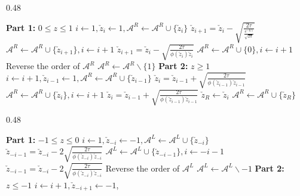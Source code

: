 \documentclass[opre,sglanonrev]{informs4}
\newcommand{\zz}{\check{z}}
\begin{document}
{\begin{APPENDICES}
\begin{table}[ht]
\begin{subtable}[t]{0.48\linewidth}
\begin{algorithmic}[1]
      \State \textbf{Part 1:} $0\leq z \leq 1$
      \State $i \gets 1, \check{z}_{i} \gets 1, \mathcal{A}^{R} \gets \mathcal{A}^{R} \cup \{\check{z}_{i}\}$
      \State $ \check{z}_{i+1} =  \check{z}_i - \sqrt{\frac{2\tau}{\frac{e^{-0.5}}{\sqrt{2 \pi}}}}$
      \vspace{5pt}
      \State $\mathcal{A}^{R} \gets \mathcal{A}^{R} \cup \{\check{z}_{i+1}\}, i \gets i + 1$
      \State $\check{z}_{i+1} = \check{z}_{i} -  \sqrt{\frac{2\tau}{\phi(\check{z}_{i})\check{z}_{i}}}$
      \EndWhile
      \State $\mathcal{A}^R \gets \mathcal{A}^{R} \cup \{0\}, i \gets i+1$
      \State Reverse the order of $\mathcal{A}^{R}$
      \State $\mathcal{A}^{R} \gets \mathcal{A}^{R} \backslash \{1\}$
      \State \textbf{Part 2:} $z \geq 1$
      \State $i \gets i + 1, \check{z}_{i-1} \gets 1, \mathcal{A}^{R} \gets \mathcal{A}^{R} \cup \{\check{z}_{i-1}\}$
      \State $\check{z}_i = \check{z}_{i-1} + \sqrt{\frac{2\tau}{\phi(\check{z}_{i-1})
      \check{z}_{i-1}}}$
      \vspace{5pt}
      \State $\mathcal{A}^{R} \gets \mathcal{A}^{R} \cup \{\check{z}_i\}, i \gets i + 1$
      \State $\check{z}_i = \check{z}_{i-1} + \sqrt{\frac{2\tau}{\phi(\check{z}_{i-1})
      \check{z}_{i-1}}}$
      \EndWhile
      \State $\zz_R \gets \zz_i$
      \State $\mathcal{A}^{R} \gets \mathcal{A}^{R} \cup \{\zz_{R}\}$
    \end{algorithmic}
  \end{subtable}\hfill
  \begin{subtable}[t]{0.48\linewidth}
    \vspace{-6pt}
    \centering
    \caption{\scriptsize Secant approximation of $\Phi(z)$, $z < 0$}
    \label{alg:breakpoint_find_negative}
    \begin{algorithmic}[1]
      \Require{$\tau$}

      \State \textbf{Part 1:} $-1\leq z \leq 0$
      \State $i \gets 1, \check{z}_{-i} \gets -1, \mathcal{A}^{L} \gets \mathcal{A}^{L} \cup \{\check{z}_{-i}\}$
      \State $ \check{z}_{-i-1} =  \check{z}_{-i} - 2\sqrt{\frac{2\tau}{\phi(\check{z}_{-i})
      \check{z}_{-i}}}$
      \vspace{5pt}
      \State $\mathcal{A}^{L} \gets \mathcal{A}^{L} \cup \{\check{z}_{-i-1}\}, i \gets -i - 1$
      \State $\check{z}_{-i-1} = \check{z}_{-i} - 2\sqrt{\frac{2\tau}{\phi(\check{z}_{-i})
      \check{z}_{-i}}}$
      \EndWhile
      \State Reverse the order of $\mathcal{A}^{L}$
      \State $\mathcal{A}^{L} \gets \mathcal{A}^{L} \backslash {-1}$
      \State \textbf{Part 2:} $z \leq -1$
      \State $i \gets i + 1, \check{z}_{-i+1} \gets -1$,
      

\end{algorithmic}
\end{subtable}
\end{table}
\end{APPENDICES}}
\end{document}
